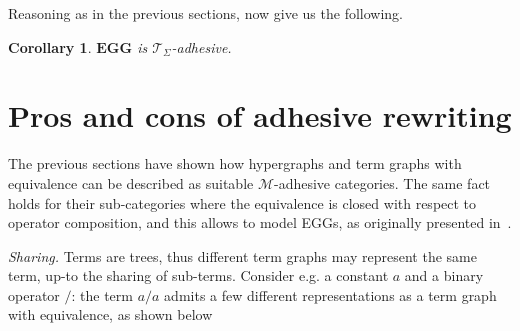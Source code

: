 \documentclass[a4paper,UKenglish,cleveref,pdftex,amsthm,thm-restate,numberwithinsect]{cas-sc}
\theoremstyle{plain}
\newtheorem{corollary}[theorem]{Corollary}
\theoremstyle{definition}
\newcommand{\eg}[0]{\mathbf{EGG}}
\begin{document}
Reasoning as in the previous sections,  now give us the following. 

\begin{corollary}
	$\eg$ is $\mathcal{T}_\Sigma$-adhesive.
\end{corollary}

\section{Pros and cons of adhesive rewriting}
\label{rewriting}
The previous sections have shown how hypergraphs and term graphs with equivalence
can be described as suitable $\mathcal{M}$-adhesive categories. 
The same fact holds for their sub-categories where the equivalence is
 closed with respect to operator composition, and this allows to
 model EGGs, as originally presented in~\cite{WillseyNWFTP21}. 

\emph{Sharing.} 
Terms are trees, thus different term graphs may represent the same term, up-to the sharing of sub-terms.
Consider e.g. a constant $a$ and a binary operator $/$: the term $a / a$ admits a few different 
representations as a term graph with equivalence, as shown below

%
\end{document}
